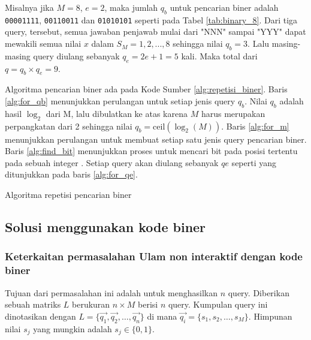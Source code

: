 Misalnya jika $M=8$, $e=2$, maka jumlah $q_b$ untuk pencarian biner adalah \texttt{00001111}, \texttt{00110011} dan \texttt{01010101} seperti pada Tabel \ref{tab:binary_8}. Dari tiga query, tersebut, semua jawaban penjawab mulai dari "NNN" sampai "YYY" dapat mewakili semua nilai $x$ dalam $S_M={1,2,...,8}$ sehingga nilai $q_b=3$. Lalu masing-masing query diulang sebanyak $q_e=2e+1=5$ kali. Maka total dari $q=q_b \times q_e=9$.

Algoritma pencarian biner ada pada Kode Sumber \ref{alg:repetisi_biner}. Baris \ref{alg:for_qb} menunjukkan perulangan untuk setiap jenis query $q_b$. Nilai $q_b$ adalah hasil $\log_2$ dari M, lalu dibulatkan ke atas karena $M$ harus merupakan perpangkatan dari 2 sehingga nilai $q_b = \text{ceil}(\log_2(M))$. Baris \ref{alg:for_m} menunjukkan perulangan untuk membuat setiap satu jenis query pencarian biner. Baris \ref{alg:find_bit} menunjukkan proses untuk mencari bit pada posisi tertentu pada sebuah integer \cite{bithack}. Setiap query akan diulang sebanyak $qe$ seperti yang ditunjukkan pada baris \ref{alg:for_qe}.

\begin{algorithm}[h]
\caption{Algoritma repetisi pencarian biner}
\label{alg:repetisi_biner}
\end{algorithm}


\subsection{Solusi menggunakan kode biner}

\subsubsection{Keterkaitan permasalahan Ulam non interaktif dengan kode biner}

Tujuan dari permasalahan ini adalah untuk menghasilkan $n$ query. Diberikan sebuah matriks $L$ berukuran $n \times M$ berisi $n$ query. Kumpulan query ini dinotasikan dengan $L = \{\vec{q_1},\vec{q_2},\ldots,\vec{q_n}\}$ di mana $\vec{q_i} = \{s_1,s_2,\ldots,s_M\}$. Himpunan nilai $s_j$ yang mungkin adalah $s_j \in \{0,1\}$.

